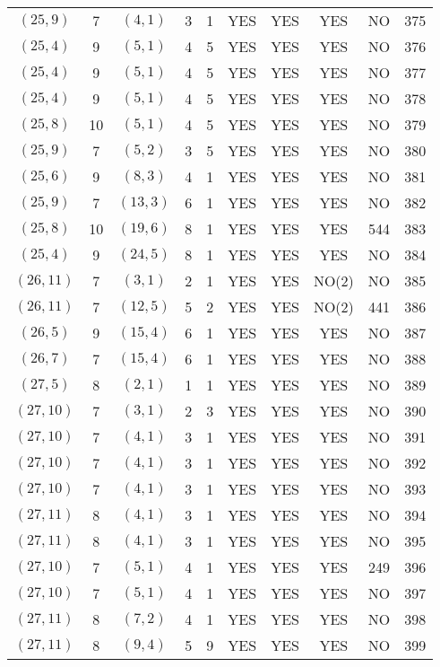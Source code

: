\begin{longtable}{|c|c|c|c|c|c|c|c|c|c|}
$(25, 9)$ & 7 & $(4, 1)$ & 3 & 1 & YES & YES & YES & NO & 375\\
$(25, 4)$ & 9 & $(5, 1)$ & 4 & 5 & YES & YES & YES & NO & 376\\
$(25, 4)$ & 9 & $(5, 1)$ & 4 & 5 & YES & YES & YES & NO & 377\\
$(25, 4)$ & 9 & $(5, 1)$ & 4 & 5 & YES & YES & YES & NO & 378\\
$(25, 8)$ & 10 & $(5, 1)$ & 4 & 5 & YES & YES & YES & NO & 379\\
$(25, 9)$ & 7 & $(5, 2)$ & 3 & 5 & YES & YES & YES & NO & 380\\
$(25, 6)$ & 9 & $(8, 3)$ & 4 & 1 & YES & YES & YES & NO & 381\\
$(25, 9)$ & 7 & $(13, 3)$ & 6 & 1 & YES & YES & YES & NO & 382\\
$(25, 8)$ & 10 & $(19, 6)$ & 8 & 1 & YES & YES & YES & 544 & 383\\
$(25, 4)$ & 9 & $(24, 5)$ & 8 & 1 & YES & YES & YES & NO & 384\\
$(26, 11)$ & 7 & $(3, 1)$ & 2 & 1 & YES & YES & NO(2) & NO & 385\\
$(26, 11)$ & 7 & $(12, 5)$ & 5 & 2 & YES & YES & NO(2) & 441 & 386\\
$(26, 5)$ & 9 & $(15, 4)$ & 6 & 1 & YES & YES & YES & NO & 387\\
$(26, 7)$ & 7 & $(15, 4)$ & 6 & 1 & YES & YES & YES & NO & 388\\
$(27, 5)$ & 8 & $(2, 1)$ & 1 & 1 & YES & YES & YES & NO & 389\\
$(27, 10)$ & 7 & $(3, 1)$ & 2 & 3 & YES & YES & YES & NO & 390\\
$(27, 10)$ & 7 & $(4, 1)$ & 3 & 1 & YES & YES & YES & NO & 391\\
$(27, 10)$ & 7 & $(4, 1)$ & 3 & 1 & YES & YES & YES & NO & 392\\
$(27, 10)$ & 7 & $(4, 1)$ & 3 & 1 & YES & YES & YES & NO & 393\\
$(27, 11)$ & 8 & $(4, 1)$ & 3 & 1 & YES & YES & YES & NO & 394\\
$(27, 11)$ & 8 & $(4, 1)$ & 3 & 1 & YES & YES & YES & NO & 395\\
$(27, 10)$ & 7 & $(5, 1)$ & 4 & 1 & YES & YES & YES & 249 & 396\\
$(27, 10)$ & 7 & $(5, 1)$ & 4 & 1 & YES & YES & YES & NO & 397\\
$(27, 11)$ & 8 & $(7, 2)$ & 4 & 1 & YES & YES & YES & NO & 398\\
$(27, 11)$ & 8 & $(9, 4)$ & 5 & 9 & YES & YES & YES & NO & 399\\

\end{longtable}

